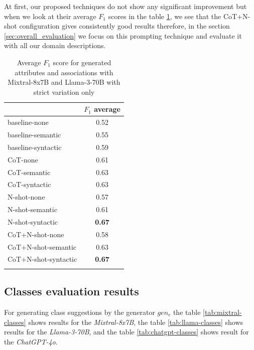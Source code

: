 At first, our proposed techniques do not show any significant improvement but when we look at their average $F_1$ scores in the table \ref{tab:F1_attributes_associations_average}, we see that the CoT+N-shot configuration gives consistently good results therefore, in the section \ref{sec:overall_evaluation} we focus on this prompting technique and evaluate it with all our domain descriptions.


\begin{table}[!h]
    \scriptsize
    \centering
    \setlength{\tabcolsep}{0.5em}
    \begin{tabular}{lc}
     \toprule
         & $F_1$ average \\
    \toprule
    
    \addlinespace
    baseline-none  & 0.52  \\
    baseline-semantic  & 0.55  \\
    baseline-syntactic  & 0.59  \\
    CoT-none	& 0.61  \\
    CoT-semantic & 0.63  \\
    CoT-syntactic & 0.63  \\
    N-shot-none & 0.57 \\
    N-shot-semantic & 0.61 \\
    N-shot-syntactic & \textbf{0.67} \\
    CoT+N-shot-none & 0.58 \\
    CoT+N-shot-semantic & 0.63 \\
    CoT+N-shot-syntactic & \textbf{0.67} \\
    \addlinespace
    \bottomrule
    \addlinespace
    \end{tabular}
    \caption{Average $F_1$ score for generated attributes and associations with Mixtral-8x7B and Llama-3-70B with strict variation only}
    \label{tab:F1_attributes_associations_average}
\end{table}


\subsection{Classes evaluation results}

For generating class suggestions by the generator $gen_c$ the table \ref{tab:mixtral-classes} shows results for the \emph{Mixtral-8x7B}, the table \ref{tab:llama-classes} shows results for the \emph{Llama-3-70B}, and the table \ref{tab:chatgpt-classes} shows result for the \emph{ChatGPT-4o}.


